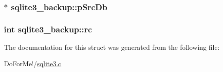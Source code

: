 \hypertarget{structsqlite3__backup_a0bcc0528bb3f5ec52eb40c3e7a4f7adc}{
\subsubsection[{p\-Src\-Db}]{$\ast$ sqlite3\-\_\-backup\-::p\-Src\-Db}}\label{structsqlite3__backup_a0bcc0528bb3f5ec52eb40c3e7a4f7adc}
\hypertarget{structsqlite3__backup_aab860dbed6181702b4c6b80d43cde411}{
\subsubsection[{rc}]{\setlength{\rightskip}{0pt plus 5cm}int sqlite3\-\_\-backup\-::rc}}\label{structsqlite3__backup_aab860dbed6181702b4c6b80d43cde411}


The documentation for this struct was generated from the following file\-:\begin{DoxyCompactItemize}
\item 
Do\-For\-Me!/\hyperlink{sqlite3_8c}{sqlite3.\-c}\end{DoxyCompactItemize}
